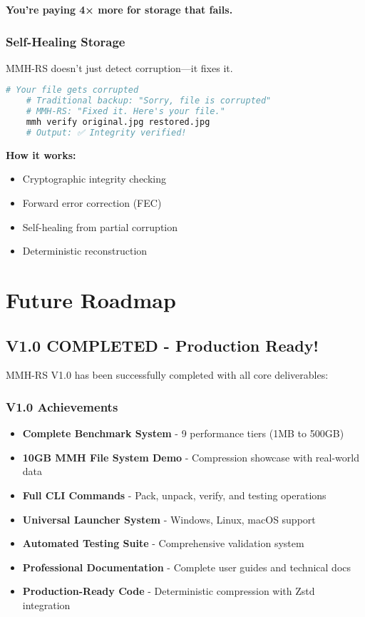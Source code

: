 \documentclass[11pt,a4paper]{article}
\begin{document}
	\textbf{You're paying 4× more for storage that fails.}

	\subsubsection{Self-Healing Storage}

	MMH-RS doesn't just detect corruption—it fixes it.

	\begin{lstlisting}[language=bash]
	# Your file gets corrupted
	# Traditional backup: "Sorry, file is corrupted"
	# MMH-RS: "Fixed it. Here's your file."
	mmh verify original.jpg restored.jpg
	# Output: ✅ Integrity verified!
	\end{lstlisting}

	\textbf{How it works:}
	\begin{itemize}
		\item Cryptographic integrity checking
		\item Forward error correction (FEC)
		\item Self-healing from partial corruption
		\item Deterministic reconstruction
	\end{itemize}

	\section{Future Roadmap}
	\label{sec:roadmap}

	\subsection{V1.0 COMPLETED - Production Ready!}

	MMH-RS V1.0 has been successfully completed with all core deliverables:

	\subsubsection{V1.0 Achievements}
	\begin{itemize}
		\item \textbf{Complete Benchmark System} - 9 performance tiers (1MB to 500GB)
		\item \textbf{10GB MMH File System Demo} - Compression showcase with real-world data
		\item \textbf{Full CLI Commands} - Pack, unpack, verify, and testing operations
		\item \textbf{Universal Launcher System} - Windows, Linux, macOS support
		\item \textbf{Automated Testing Suite} - Comprehensive validation system
		\item \textbf{Professional Documentation} - Complete user guides and technical docs
		\item \textbf{Production-Ready Code} - Deterministic compression with Zstd integration
	\end{itemize}
\end{document}

